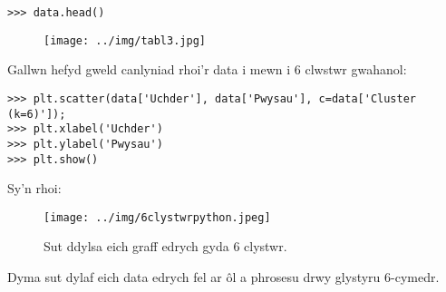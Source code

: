 \begin{verbatim}
>>> data.head()
\end{verbatim}

\begin{figure}[H]
\begin{center}
\texttt{[image: ../img/tabl3.jpg]}
\end{center}
\label{fig:Data3}
\end{figure}

Gallwn hefyd gweld canlyniad rhoi'r data i mewn i 6 clwstwr gwahanol: 

\begin{verbatim}
>>> plt.scatter(data['Uchder'], data['Pwysau'], c=data['Cluster (k=6)']);
>>> plt.xlabel('Uchder')
>>> plt.ylabel('Pwysau')
>>> plt.show()
\end{verbatim}

Sy'n rhoi:

\begin{figure}[H]
\begin{center}
\texttt{[image: ../img/6clystwrpython.jpeg]}
\caption{Sut ddylsa eich graff edrych gyda 6 clystwr.}
\label{fig:6clystwrpython}
\end{center}
\end{figure}

Dyma sut dylaf eich data edrych fel ar \^{o}l a phrosesu drwy glystyru 6-cymedr. 
